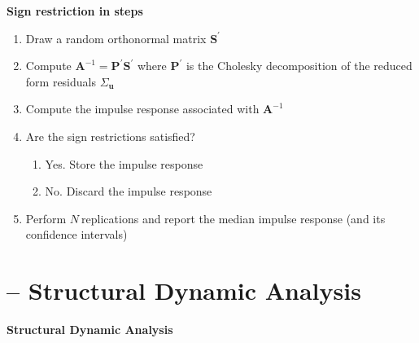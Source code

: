 \documentclass[10pt,handout]{beamer}
\begin{document}
\vspace{.1cm}

\begin{frame}
{\textbf{Sign restriction in steps}}

\begin{enumerate}
\item Draw a random orthonormal matrix $\mathbf{S}^{\prime }$\medskip 
\pause

\item Compute $\mathbf{A}^{-1}=\mathbf{P}^{\prime }\mathbf{S}^{\prime }$
where $\mathbf{P}^{\prime }$ is the Cholesky decomposition of the reduced
form residuals $\Sigma _{\mathbf{u}}$\medskip \pause

\item Compute the impulse response associated with $\mathbf{A}^{-1}$\medskip 
\pause

\item Are the sign restrictions satisfied?

\begin{enumerate}
\item Yes. Store the impulse response

\item No. Discard the impulse response\medskip \pause
\end{enumerate}

\item Perform $N\ $replications and report the median impulse response (and
its confidence intervals)
\end{enumerate}
\end{frame}

\vspace{.1cm}

\section{ -- Structural Dynamic Analysis}

\begin{frame}
\color{title} \centering \Large%
\textbf{Structural Dynamic Analysis}
\end{frame}

\vspace{.1cm}
\end{document}
